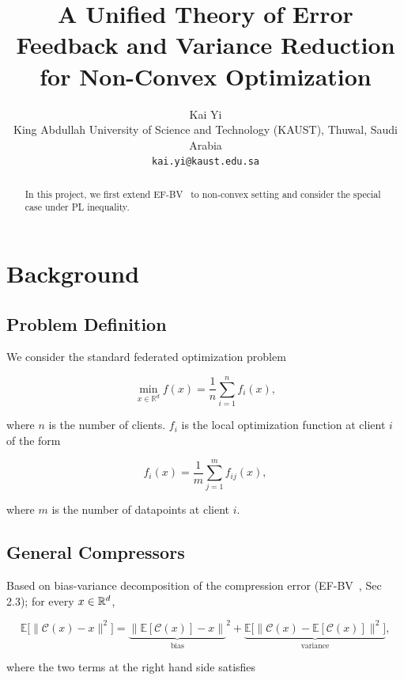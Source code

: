 \documentclass{article} %
\title{A Unified Theory of Error Feedback and Variance Reduction for Non-Convex Optimization}
\author{Kai Yi\\
   King Abdullah University of Science and Technology (KAUST), Thuwal, Saudi Arabia\\
   \texttt{kai.yi@kaust.edu.sa}
}
\newcommand{\algname}[1]{{\sf\green\relscale{0.90}#1}\xspace}
\theoremstyle{plain}
\theoremstyle{definition}
\theoremstyle{remark}
\newcommand{\green}{\color{mydarkgreen}}
\begin{document}
\maketitle


\begin{abstract}  
In this project, we first extend EF-BV~\cite{condat2022ef} to non-convex setting and consider the special case under PL inequality. 
\end{abstract}

\tableofcontents
\newpage

\section{Background}
\subsection{Problem Definition}
We consider the standard federated optimization problem

\begin{equation}
   \min_{x\in\mathbb{R}^d} f(x) = \frac{1}{n}\sum_{i=1}^n f_i (x),
\end{equation}

where $n$ is the number of clients. $f_i$ is the local optimization function at client $i$ of the form 

\begin{equation}
   f_i(x) = \frac{1}{m} \sum_{j=1}^m f_{ij} (x),
\end{equation}

where $m$ is the number of datapoints at client $i$. 

\subsection{General Compressors}
Based on bias-variance decomposition of the compression error (\algname{EF-BV}~\cite{condat2022ef}, Sec 2.3); for every $x\in \mathbb{R}^d$,

\begin{equation}
   \mathbb{E}\big[\|\mathcal{C}(x)-x\|^2\big] = {\underbrace{\big\| \mathbb{E}[\mathcal{C}(x)]-x\big\|}_{\text{bias}}}^2 + \underbrace{\mathbb{E}\Big[\big\|\mathcal{C}(x)-\mathbb{E}[\mathcal{C}(x)]\big\|^2\Big]}_{\text{variance}},\label{eqbiva}
   \end{equation}

where the two terms at the right hand side satisfies
\end{document}

